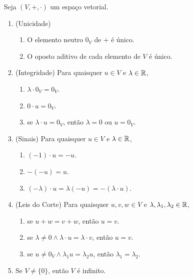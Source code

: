\begin{proposition} \label{prop.alglin:manobras_algebricas}
    Seja $(V, +, \cdot)$ um espaço vetorial.
        \begin{enumerate}[leftmargin=*, align=left, label=\textbf{(\alph*)}]
            \item (Unicidade)
                \begin{enumerate}[label=\roman*.]
                    \item O elemento neutro $0_V$ de $+$ é único.
                    \item O oposto aditivo de cada elemento de $V$ é único.
                \end{enumerate}
            \item (Integridade) Para quaisquer $u \in V$ e $\lambda \in \mathbb{R}$,
                \begin{enumerate}[label=\roman*.]
                    \item $\lambda \cdot 0_V = 0_V$.
                    \item $0 \cdot u = 0_V$.
                    \item se $\lambda \cdot u = 0_V$, então $\lambda = 0$ ou $u = 0_V$.
                \end{enumerate}
            \item (Sinais) Para quaisquer $u \in V$ e $\lambda \in \mathbb{R}$,
                \begin{enumerate}[label=\roman*.]
                    \item $(-1) \cdot u = -u$.
                    \item $-(-u) = u$.
                    \item $(- \lambda) \cdot u = \lambda (-u) = -(\lambda \cdot u)$.
                \end{enumerate}
            \item (Leis do Corte) Para quaisquer $u,v,w \in V$ e $\lambda, \lambda_1, \lambda_2 \in \mathbb{R}$,
                \begin{enumerate}[label=\roman*.]
                    \item se $u + w = v + w$, então $u = v$.
                    \item se $\lambda \neq 0 \land \lambda \cdot u = \lambda \cdot v$, então $u = v$.
                    \item se $u \neq 0_V \land \lambda_1 u = \lambda_2 u$, então $\lambda_1 = \lambda_2$.
                \end{enumerate}
            \item Se $V \neq \{0 \}$, então $V$ é infinito.
        \end{enumerate}
\end{proposition}


